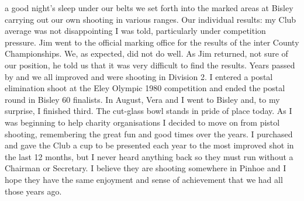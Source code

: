 a good night's sleep under our belts we set forth into the marked areas at
Bisley carrying out our own shooting in various ranges. Our individual results:
my Club average was not disappointing I was told, particularly under
competition pressure. Jim went to the official marking office for the results
of the inter County Championships. We, as expected, did not do well. As Jim
returned, not sure of our position, he told us that it was very difficult to
find the results. Years passed by and we all improved and were shooting in
Division 2. I entered a postal elimination shoot at the Eley Olympic 1980
competition and ended the postal round in Bisley 60 finalists. In August, Vera
and I went to Bisley and, to my surprise, I finished third. The cut-glass bowl
stands in pride of place today. As I was beginning to help charity
organisations I decided to move on from pistol shooting, remembering the great
fun and good times over the years. I purchased and gave the Club a cup to be
presented each year to the most improved shot in the last 12 months, but I
never heard anything back so they must run without a Chairman or Secretary. I
believe they are shooting somewhere in Pinhoe and I hope they have the same
enjoyment and sense of achievement that we had all those years ago.